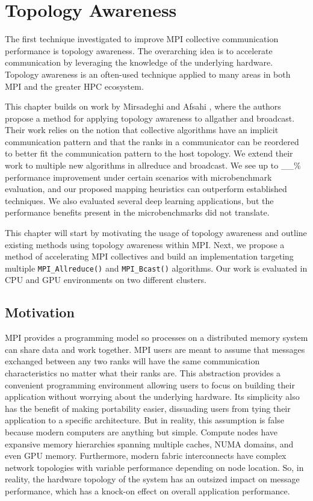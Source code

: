 
\chapter[Topology Awaeness]{Topology Awareness}\label{ch:TopologyAwareness}

The first technique investigated to improve MPI collective communication performance is topology awareness.
The overarching idea is to accelerate communication by leveraging the knowledge of the underlying hardware.
Topology awareness is an often-used technique applied to many areas in both MPI and the greater HPC ecosystem.

This chapter builds on work by Mirsadeghi and Afsahi \cite{Mirsadeghi2016TopoAwareCollRR}, where the authors propose a method for applying topology awareness to allgather and broadcast.
Their work relies on the notion that collective algorithms have an implicit communication pattern and that the ranks in a communicator can be reordered to better fit the communication pattern to the host topology.
We extend their work to multiple new algorithms in allreduce and broadcast.
We see up to \_\_\% performance improvement under certain scenarios with microbenchmark evaluation, and our proposed mapping heuristics can outperform established techniques.
We also evaluated several deep learning applications, but the performance benefits present in the microbenchmarks did not translate.

This chapter will start by motivating the usage of topology awareness and outline existing methods using topology awareness within MPI.
Next, we propose a method of accelerating MPI collectives and build an implementation targeting multiple \texttt{MPI\_Allreduce()} and \texttt{MPI\_Bcast()} algorithms.
Our work is evaluated in CPU and GPU environments on two different clusters.

\section{Motivation}
MPI provides a programming model so processes on a distributed memory system can share data and work together.
MPI users are meant to assume that messages exchanged between any two ranks will have the same communication characteristics no matter what their ranks are. 
This abstraction provides a convenient programming environment allowing users to focus on building their application without worrying about the underlying hardware. 
Its simplicity also has the benefit of making portability easier, dissuading users from tying their application to a specific architecture.
But in reality, this assumption is false because modern computers are anything but simple. 
Compute nodes have expansive memory hierarchies spanning multiple caches, NUMA domains, and even GPU memory.
Furthermore, modern fabric interconnects have complex network topologies with variable performance depending on node location.
So, in reality, the hardware topology of the system has an outsized impact on message performance, which has a knock-on effect on overall application performance. 

